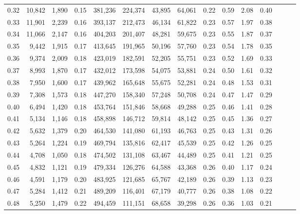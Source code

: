 \begin{tabular}{rrrrrrrrrrrrrrr}
0.32 &  10,842 &  1,890 &  0.15 &  381,236 &  224,374 &   43,895 &   64,061 &  0.22 &  0.59 &  2.08 &      0.40 \\
0.33 &  11,901 &  2,239 &  0.16 &  393,137 &  212,473 &   46,134 &   61,822 &  0.23 &  0.57 &  1.97 &      0.38 \\
0.34 &  11,066 &  2,147 &  0.16 &  404,203 &  201,407 &   48,281 &   59,675 &  0.23 &  0.55 &  1.87 &      0.37 \\
0.35 &   9,442 &  1,915 &  0.17 &  413,645 &  191,965 &   50,196 &   57,760 &  0.23 &  0.54 &  1.78 &      0.35 \\
0.36 &   9,374 &  2,009 &  0.18 &  423,019 &  182,591 &   52,205 &   55,751 &  0.23 &  0.52 &  1.69 &      0.33 \\
0.37 &   8,993 &  1,870 &  0.17 &  432,012 &  173,598 &   54,075 &   53,881 &  0.24 &  0.50 &  1.61 &      0.32 \\
0.38 &   7,950 &  1,600 &  0.17 &  439,962 &  165,648 &   55,675 &   52,281 &  0.24 &  0.48 &  1.53 &      0.31 \\
0.39 &   7,308 &  1,573 &  0.18 &  447,270 &  158,340 &   57,248 &   50,708 &  0.24 &  0.47 &  1.47 &      0.29 \\
0.40 &   6,494 &  1,420 &  0.18 &  453,764 &  151,846 &   58,668 &   49,288 &  0.25 &  0.46 &  1.41 &      0.28 \\
0.41 &   5,134 &  1,146 &  0.18 &  458,898 &  146,712 &   59,814 &   48,142 &  0.25 &  0.45 &  1.36 &      0.27 \\
0.42 &   5,632 &  1,379 &  0.20 &  464,530 &  141,080 &   61,193 &   46,763 &  0.25 &  0.43 &  1.31 &      0.26 \\
0.43 &   5,264 &  1,224 &  0.19 &  469,794 &  135,816 &   62,417 &   45,539 &  0.25 &  0.42 &  1.26 &      0.25 \\
0.44 &   4,708 &  1,050 &  0.18 &  474,502 &  131,108 &   63,467 &   44,489 &  0.25 &  0.41 &  1.21 &      0.25 \\
0.45 &   4,832 &  1,121 &  0.19 &  479,334 &  126,276 &   64,588 &   43,368 &  0.26 &  0.40 &  1.17 &      0.24 \\
0.46 &   4,591 &  1,179 &  0.20 &  483,925 &  121,685 &   65,767 &   42,189 &  0.26 &  0.39 &  1.13 &      0.23 \\
0.47 &   5,284 &  1,412 &  0.21 &  489,209 &  116,401 &   67,179 &   40,777 &  0.26 &  0.38 &  1.08 &      0.22 \\
0.48 &   5,250 &  1,479 &  0.22 &  494,459 &  111,151 &   68,658 &   39,298 &  0.26 &  0.36 &  1.03 &      0.21 \\

\end{tabular}
